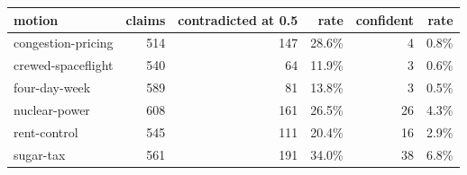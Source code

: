 \begin{tabular}{lrrrrr}
\toprule
motion & claims & contradicted at 0.5 & rate & confident & rate \\
\midrule
congestion-pricing & 514 & 147 & 28.6\% & 4 & 0.8\% \\
crewed-spaceflight & 540 & 64 & 11.9\% & 3 & 0.6\% \\
four-day-week & 589 & 81 & 13.8\% & 3 & 0.5\% \\
nuclear-power & 608 & 161 & 26.5\% & 26 & 4.3\% \\
rent-control & 545 & 111 & 20.4\% & 16 & 2.9\% \\
sugar-tax & 561 & 191 & 34.0\% & 38 & 6.8\% \\
\bottomrule
\end{tabular}
